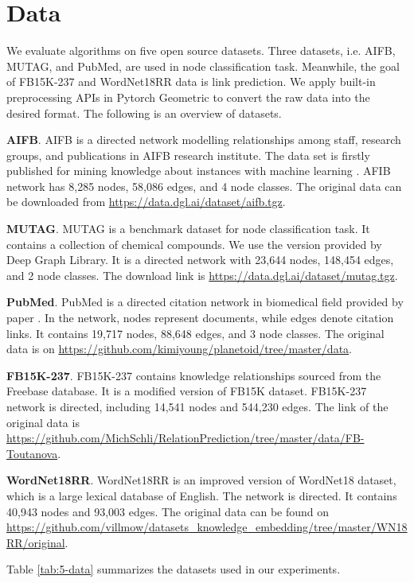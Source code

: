 \documentclass[sigconf]{acmart}
\begin{document}
\section{Data}\label{sec-data}
We evaluate algorithms on five open source datasets. Three datasets, i.e. AIFB, MUTAG, and PubMed, are used in node classification task. Meanwhile, the goal of FB15K-237 and WordNet18RR data is link prediction. We apply built-in preprocessing APIs in Pytorch Geometric to convert the raw data into the desired format. The following is an overview of datasets.\par
\vspace{0.2cm}
\noindent\textbf{AIFB}. AIFB is a directed network modelling relationships among staff, research groups, and publications in AIFB research institute. The data set is firstly published for mining knowledge about instances with machine learning \cite{aifb}. AFIB network has 8,285 nodes, 58,086 edges, and 4 node classes. The original data can be downloaded from \url{https://data.dgl.ai/dataset/aifb.tgz}.\par
\vspace{0.2cm}
\noindent\textbf{MUTAG}. MUTAG is a benchmark dataset for node classification task. It contains a collection of chemical compounds. We use the version provided by Deep Graph Library. It is a directed network with 23,644 nodes, 148,454 edges, and 2 node classes. The download link is \url{https://data.dgl.ai/dataset/mutag.tgz}.\par
\vspace{0.2cm}
\noindent\textbf{PubMed}. PubMed is a directed citation network in biomedical field provided by paper \cite{pubmed}. In the network, nodes represent documents, while edges denote citation links. It contains 19,717 nodes, 88,648 edges, and 3 node classes. The original data is on \url{https://github.com/kimiyoung/planetoid/tree/master/data}.\par
\vspace{0.2cm}
\noindent\textbf{FB15K-237}. FB15K-237 contains knowledge relationships sourced from the Freebase database. It is a modified version of FB15K dataset. FB15K-237 network is directed, including 14,541 nodes and 544,230 edges. The link of the original data is \url{https://github.com/MichSchli/RelationPrediction/tree/master/data/FB-Toutanova}.\par
\vspace{0.2cm}
\noindent\textbf{WordNet18RR}. WordNet18RR is an improved version of WordNet18 dataset, which is a large lexical database of English. The network is directed. It contains 40,943 nodes and 93,003 edges. The original data can be found on \url{https://github.com/villmow/datasets_knowledge_embedding/tree/master/WN18RR/original}.\par
\vspace{0.2cm}
Table \ref{tab:5-data} summarizes the datasets used in our experiments.
\end{document}
